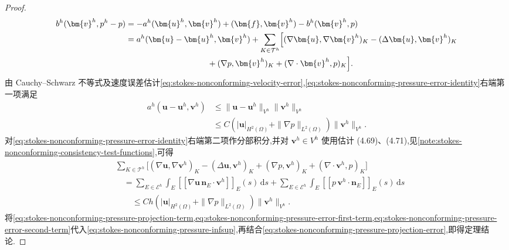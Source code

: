\begin{proof}
\begin{equation}
\begin{aligned}
  b^h(\bm{v}^h,p^h-p)
  &=-a^h(\bm{u}^h,\bm{v}^h)+(\bm{f},\bm{v}^h)
       -b^h(\bm{v}^h,p)\\
  &=a^h(\bm{u}-\bm{u}^h,\bm{v}^h)
    +\sum_{K\in\mathcal{T}^h}\Bigl[
       (\nabla\bm{u},\nabla\bm{v}^h)_K
       -(\Delta\bm{u},\bm{v}^h)_K\\
  &\qquad\qquad\qquad\qquad\qquad
       +(\nabla p,\bm{v}^h)_K
       +(\nabla\cdot\bm{v}^h,p)_K\Bigr].
\end{aligned}
\end{equation}
由 Cauchy--Schwarz 不等式及速度误差估计\cref{eq:stokes-nonconforming-velocity-error},\cref{eq:stokes-nonconforming-pressure-error-identity}右端第一项满足
\begin{equation}\label{eq:stokes-nonconforming-pressure-error-first-term}
\begin{aligned}
  a^h(\bm{u}-\bm{u}^h,\bm{v}^h)
  &\leq\|\bm{u}-\bm{u}^h\|_{V^h}\|\bm{v}^h\|_{V^h}\\
  &\leq C\left(|\bm{u}|_{H^2(\Omega)}
      +\|\nabla p\|_{L^2(\Omega)}\right)\|\bm{v}^h\|_{V^h}.
\end{aligned}
\end{equation}
对\cref{eq:stokes-nonconforming-pressure-error-identity}右端第二项作分部积分,并对 $\bm{v}^h\in V^h$ 使用估计 (4.69)、(4.71),见\cref{note:stokes-nonconforming-consistency-test-functions},可得
\begin{equation}\label{eq:stokes-nonconforming-pressure-error-second-term}
\begin{aligned}
 &\sum_{K\in\mathcal{T}^h}\bigl[
       (\nabla\bm{u},\nabla\bm{v}^h)_K
       -(\Delta\bm{u},\bm{v}^h)_K
       +(\nabla p,\bm{v}^h)_K
       +(\nabla\cdot\bm{v}^h,p)_K\bigr]\\
 &\quad=\sum_{E\in\mathcal{E}^h}
       \int_E\left[\!\left[\nabla\bm{u}\,\bm{n}_E
                         \cdot\bm{v}^h\right]\!\right]_E(s)\,\mathrm{d}s
       +\sum_{E\in\mathcal{E}^h}
       \int_E\left[\!\left[p\,\bm{v}^h\cdot\bm{n}_E\right]\!\right]_E(s)\,\mathrm{d}s\\
 &\qquad\leq Ch\left(|\bm{u}|_{H^2(\Omega)}
       +\|\nabla p\|_{L^2(\Omega)}\right)\|\bm{v}^h\|_{V^h}.
\end{aligned}
\end{equation}
将\cref{eq:stokes-nonconforming-pressure-projection-term,eq:stokes-nonconforming-pressure-error-first-term,eq:stokes-nonconforming-pressure-error-second-term}代入\cref{eq:stokes-nonconforming-pressure-infsup},再结合\cref{eq:stokes-nonconforming-pressure-projection-error},即得定理结论.
\end{proof}

